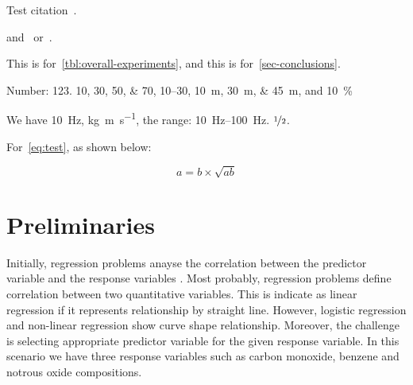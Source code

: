 


Test citation~\cite{BL12J01}. 
\begin{JournalOnly}
and~\citep{BJL11J01} or~\citet{BJL11J01}.
\end{JournalOnly}

This is for~\cref{tbl:overall-experiments}, 
and this is for~\cref{sec-conclusions}.
%

Number:
\num{123}.
\numlist{10;30;50;70},
\numrange{10}{30},
\SIlist{10;30;45}{\metre},
and
\SI{10}{\percent}



\begin{ConferenceOnly}
We have \SI{10}{\hertz},
\si{\kilogram\metre\per\second},
the range: \SIrange{10}{100}{\hertz}.
$\nicefrac[]{1}{2}$.


\end{ConferenceOnly}


For~\cref{eq:test},
as shown below:

\begin{equation}\label{eq:test}
a = b \times \sqrt{ab}
\end{equation}

\blindmathpaper

\section{Preliminaries} \label{sec-preliminaries}

Initially, regression problems 
anayse the correlation between 
the predictor variable and the response variables \cite{uyanik2013study}.
Most probably, regression problems define correlation 
between two quantitative variables.
This is indicate as linear regression if it represents 
relationship by straight line. 
However, logistic regression and non-linear regression show curve shape relationship. 
Moreover, the challenge is 
selecting appropriate predictor 
variable for the given response variable. 
In this scenario we have three 
response variables such as 
carbon monoxide, benzene and notrous oxide compositions.

